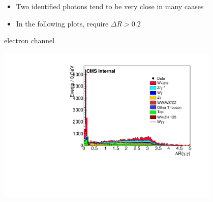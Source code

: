 \documentclass{beamer}
\begin{document}
 {


    \begin{itemize}
        \item Two identified photons tend to be very close in many caases
        \item In the following plots, require $\Delta R > 0.2$
    \end{itemize}

    \bc
     
         electron channel
             
         \includegraphics[width=0.8\textwidth]{Plots/DRPhPh_1el2ph.pdf}



    \ec

}
\end{document}
